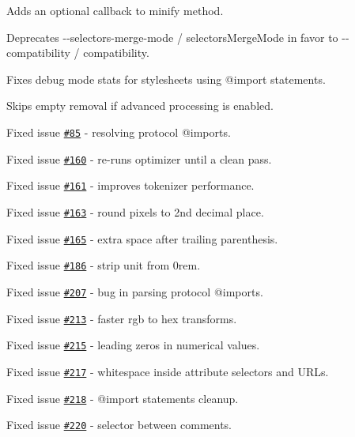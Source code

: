 \begin{DoxyItemize}
\item Adds an optional callback to minify method.
\item Deprecates {\ttfamily -\/-\/selectors-\/merge-\/mode} / {\ttfamily selectors\+Merge\+Mode} in favor to {\ttfamily -\/-\/compatibility} / {\ttfamily compatibility}.
\item Fixes debug mode stats for stylesheets using {\ttfamily @import} statements.
\item Skips empty removal if advanced processing is enabled.
\item Fixed issue \href{https://github.com/jakubpawlowicz/clean-css/issues/85}{\tt \#85} -\/ resolving protocol {\ttfamily @import}s.
\item Fixed issue \href{https://github.com/jakubpawlowicz/clean-css/issues/160}{\tt \#160} -\/ re-\/runs optimizer until a clean pass.
\item Fixed issue \href{https://github.com/jakubpawlowicz/clean-css/issues/161}{\tt \#161} -\/ improves tokenizer performance.
\item Fixed issue \href{https://github.com/jakubpawlowicz/clean-css/issues/163}{\tt \#163} -\/ round pixels to 2nd decimal place.
\item Fixed issue \href{https://github.com/jakubpawlowicz/clean-css/issues/165}{\tt \#165} -\/ extra space after trailing parenthesis.
\item Fixed issue \href{https://github.com/jakubpawlowicz/clean-css/issues/186}{\tt \#186} -\/ strip unit from {\ttfamily 0rem}.
\item Fixed issue \href{https://github.com/jakubpawlowicz/clean-css/issues/207}{\tt \#207} -\/ bug in parsing protocol {\ttfamily @import}s.
\item Fixed issue \href{https://github.com/jakubpawlowicz/clean-css/issues/213}{\tt \#213} -\/ faster {\ttfamily rgb} to {\ttfamily hex} transforms.
\item Fixed issue \href{https://github.com/jakubpawlowicz/clean-css/issues/215}{\tt \#215} -\/ leading zeros in numerical values.
\item Fixed issue \href{https://github.com/jakubpawlowicz/clean-css/issues/217}{\tt \#217} -\/ whitespace inside attribute selectors and U\+R\+Ls.
\item Fixed issue \href{https://github.com/jakubpawlowicz/clean-css/issues/218}{\tt \#218} -\/ {\ttfamily @import} statements cleanup.
\item Fixed issue \href{https://github.com/jakubpawlowicz/clean-css/issues/220}{\tt \#220} -\/ selector between comments.

\end{DoxyItemize}
